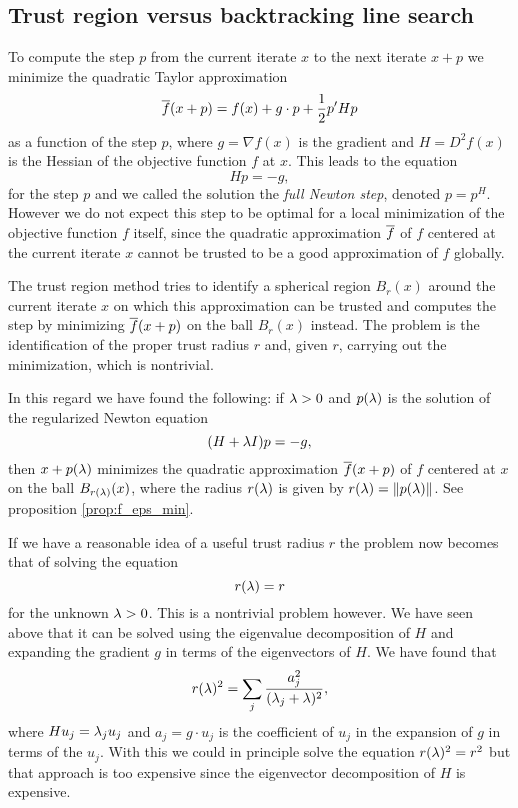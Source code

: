 \subsection{Trust region versus backtracking line search}

To compute the step $p$ from the current iterate $x$ to the next iterate $x+p$ we minimize the quadratic Taylor 
approximation 
$$
\overline f(x+p)=f(x)+g\cdot p +\frac{1}{2}p'Hp
$$
as a function of the step $p$, where $g=\nabla f(x)$ is the gradient and $H=D^2f(x)$ is the Hessian of the objective function $f$ at $x$. This leads to the equation
%
\begin{equation}
\label{p_H}
Hp=-g,
\end{equation}
%
for the step $p$ and we called the solution the \textit{full Newton step}, denoted $p=p^H$.
However we do not expect this step to be optimal for a local minimization of the objective function $f$ itself,
since the quadratic approximation $\overline f$ of $f$ centered at the current iterate $x$ cannot be trusted to be  
a good approximation of $f$ globally.

The trust region method tries to identify a spherical region $B_r(x)$ around the current iterate $x$ on which this 
approximation can be trusted and computes the step by minimizing $\overline f(x+p)$ on the ball $B_r(x)$ instead. 
The problem is the identification of the proper trust radius $r$ and, given $r$, carrying out the minimization,
which is nontrivial.

In this regard we have found the following: if $\lambda>0$ and $p(\lambda)$ is the solution of the regularized Newton equation    
%
\begin{equation}
\label{p_H_l}
(H+\lambda I)p=-g,
\end{equation}
%
then $x+p(\lambda)$ minimizes the quadratic approximation $\overline f(x+p)$ of $f$ centered at $x$ on the ball $B_{r(\lambda)}(x)$,
where the radius $r(\lambda)$ is given by $r(\lambda)=\left\|p(\lambda)\right\|$. See proposition \ref{prop:f_eps_min}.

\noindent
If we have a reasonable idea of a useful trust radius $r$ the problem now becomes that of solving the equation
%
\begin{equation}
\label{r_l}
r(\lambda)=r
\end{equation}
%
for the unknown $\lambda>0$. This is a nontrivial problem however. We have seen above that it can be solved using the 
eigenvalue decomposition of $H$ and expanding the gradient $g$ in terms of the eigenvectors of $H$. We have found 
that
$$
r(\lambda)^2 = \sum_j\frac{a_j^2}{(\lambda_j+\lambda)^2},
$$
where $Hu_j=\lambda_ju_j$ and $a_j=g\cdot u_j$ is the coefficient of $u_j$ in the expansion of $g$ in terms of the $u_j$.
With this we could in principle solve the equation $r(\lambda)^2=r^2$ but that approach is too expensive since the eigenvector   
decomposition of $H$ is expensive.


